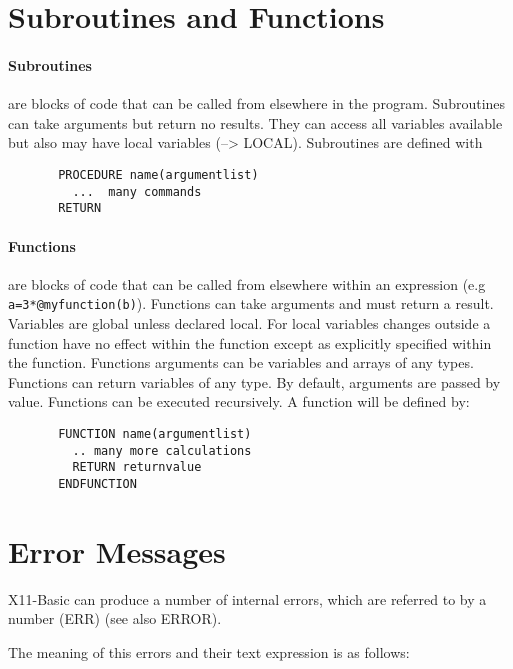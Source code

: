 \section{Subroutines and Functions}
\paragraph{Subroutines}
are  blocks  of  code that can be called from
elsewhere in the program.  Subroutines can  take  arguments
but  return  no  results.  They  can  access all variables
available but also may have local variables  (-->  LOCAL).
Subroutines are defined with
\begin{verbatim}
       PROCEDURE name(argumentlist)
         ...  many commands
       RETURN
\end{verbatim}

\paragraph{Functions}
are blocks of code that can be called from elsewhere 
within an expression (e.g \verb|a=3*@myfunction(b)|).  Functions  can take
arguments and must return a result.  Variables are global unless declared 
local. For local variables changes outside a function have no effect within
the function except as explicitly specified within the function. Functions 
arguments can be variables and arrays of any types. Functions can return 
variables of any type. By default, arguments are passed by value. Functions
can be executed recursively. A function will be defined by:
\begin{verbatim}
       FUNCTION name(argumentlist)
         .. many more calculations
         RETURN returnvalue
       ENDFUNCTION
\end{verbatim}

\section{Error Messages}

X11-Basic can produce a number of internal errors, which are referred 
to by a number (ERR) (see also ERROR).

The meaning of this errors and their text expression is as follows:

\begin{tabbing}

\end{tabbing}
